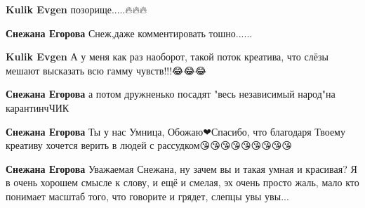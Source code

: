 \begin{itemize}
\begin{itemize}
\textbf{Kulik Evgen} позорище.....🔥🔥🔥

 
\textbf{Снежана Егорова} Снеж,даже комментировать тошно......


 
\textbf{Kulik Evgen} А у меня как раз наоборот, такой поток креатива, что слёзы мешают высказать всю гамму чувств!!!😂😂😂

 
\textbf{Снежана Егорова} а потом дружненько посадят "весь независимый народ"на карантинчЧИК

 
\textbf{Снежана Егорова} Ты у нас Умница, Обожаю❤Спасибо, что благодаря Твоему
креативу хочется верить в людей с рассудком😘😘😘😘😘😘😘😘😘

 
\textbf{Снежана Егорова} Уважаемая Снежана, ну зачем вы и такая умная и
красивая? Я в очень хорошем смысле к слову, и ещё и смелая, эх очень просто
жаль, мало кто понимает масштаб того, что говорите и грядет, слепцы увы увы...
\end{itemize}

 

\end{itemize}
